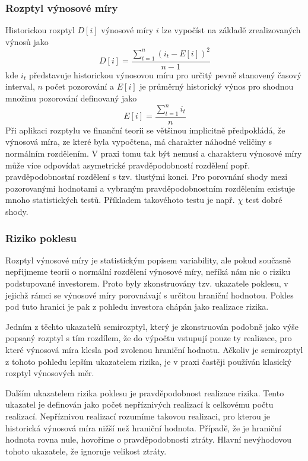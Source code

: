 \documentclass[a4paper]{book}
\begin{document}
\subsubsection{Rozptyl výnosové míry}

Historickou rozptyl $D[i]$ výnosové míry $i$ lze vypočíst na základě zrealizovaných výnosů jako
\begin{equation*}
D[i] = \frac{\sum_{t=1}^n (i_t - E[i])^2}{n-1}
\end{equation*}
kde $i_t$ představuje historickou výnosovou míru pro určitý pevně stanovený časový interval, $n$ počet pozorování a $E[i]$ je průměrný historický výnos pro shodnou množinu pozorování definovaný jako
\begin{equation*}
E[i] = \frac{\sum_{t=1}^n i_t}{n}
\end{equation*}
Při aplikaci rozptylu ve finanční teorii se většinou implicitně předpokládá, že výnosová míra, ze které byla vypočtena, má charakter náhodné veličiny s normálním rozdělením. V praxi tomu tak být nemusí a charakteru výnosové míry může více odpovídat asymetrické pravděpodobností rozdělení popř. pravděpodobnostní rozdělení s tzv. tlustými konci. Pro porovnání shody mezi pozorovanými hodnotami a vybraným pravděpodobnostním rozdělením existuje mnoho statistických testů. Příkladem takovéhoto testu je např. $\chi$ test dobré shody.

\subsubsection{Riziko poklesu}

Rozptyl výnosové míry je statistickým popisem variability, ale pokud současně nepřijmeme teorii o normální rozdělení výnosové míry, neříká nám nic o riziku podstupované investorem. Proto byly zkonstruovány tzv. ukazatele poklesu, v jejichž rámci se výnosové míry porovnávají s určitou hraniční hodnotou. Pokles pod tuto hranici je pak z pohledu investora chápán jako realizace rizika.

Jedním z těchto ukazatelů semirozptyl, který je zkonstruován podobně jako výše popsaný rozptyl s tím rozdílem, že do výpočtu vstupují pouze ty realizace, pro které výnosová míra klesla pod zvolenou hraniční hodnotu. Ačkoliv je semirozptyl z tohoto pohledu lepším ukazatelem rizika, je v praxi častěji používán klasický rozptyl výnosových měr.

Dalším ukazatelem rizika poklesu je pravděpodobnost realizace rizika. Tento ukazatel je definován jako počet nepříznivých realizací k celkovému počtu realizací. Nepříznivou realizací rozumíme takovou realizaci, pro kterou je historická výnosová míra nižší než hraniční hodnota. Případě, že je hraniční hodnota rovna nule, hovoříme o pravděpodobnosti ztráty. Hlavní nevýhodovou tohoto ukazatele, že ignoruje velikost ztráty.
\end{document}
